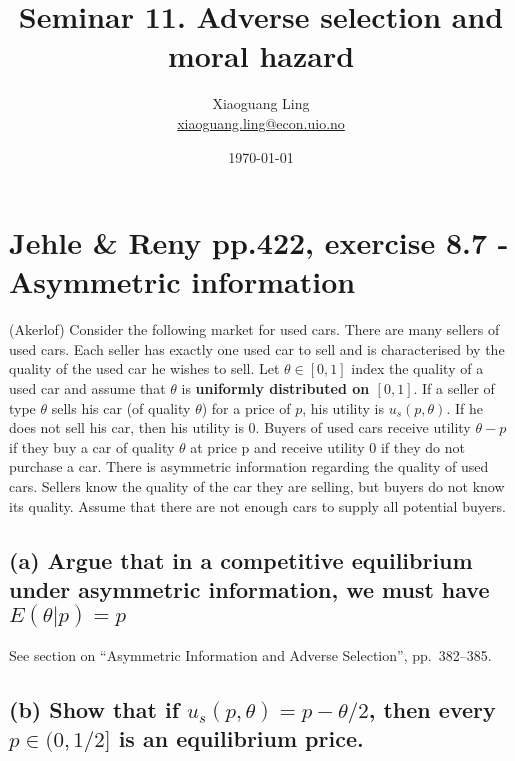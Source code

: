 \documentclass{article}
\title{Seminar 11. Adverse selection and moral hazard}
\author{Xiaoguang Ling \\  \href{xiaoguang.ling@econ.uio.no}{xiaoguang.ling@econ.uio.no}}
\date{\today}
\begin{document}
\maketitle


\section{Jehle \& Reny pp.422, exercise 8.7 - Asymmetric information}

(Akerlof) Consider the following market for used cars. There are many sellers of used cars. Each
seller has exactly one used car to sell and is characterised by the quality of the used car he wishes to
sell. Let $\theta \in [0, 1]$ index the quality of a used car and assume that $\theta$ is \textbf{uniformly distributed on $[0, 1]$}.
If a seller of type $\theta$ sells his car (of quality $\theta$) for a price of $p$, his utility is $u_s(p, \theta)$. If he does not sell
his car, then his utility is 0. Buyers of used cars receive utility $\theta - p$ if they buy a car of quality $\theta$ at
price p and receive utility 0 if they do not purchase a car. There is asymmetric information regarding
the quality of used cars. Sellers know the quality of the car they are selling, but buyers do not know
its quality. Assume that there are not enough cars to supply all potential buyers.


\subsection*{(a) Argue that in a competitive equilibrium under asymmetric information, we must have
$E(\theta | p) = p$}


See section on ``Asymmetric Information and Adverse Selection'', pp.~382--385.


\subsection*{(b) Show that if $u_s(p, \theta) = p - \theta/2$, then every $p \in (0, 1/2]$ is an equilibrium price.}
\end{document}
